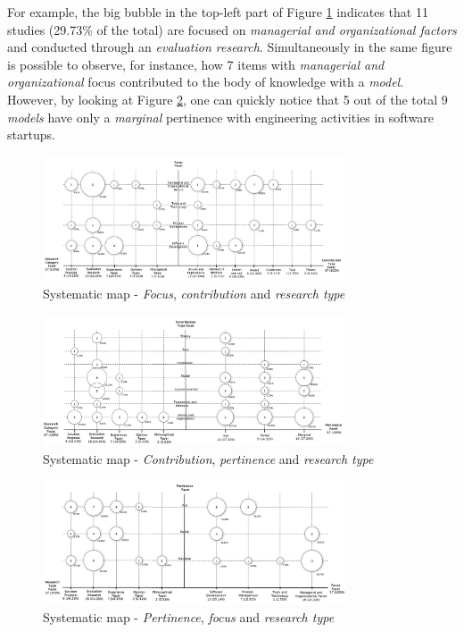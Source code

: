 \documentclass[final,5p,times,twocolumn]{elsarticle}
\begin{document}
For example, the big bubble in the top-left part of Figure \ref{fig:ms:fcr} indicates that 11 studies (29.73\% of the total) are focused on \textit{managerial and organizational factors} and conducted through an \textit{evaluation research}. Simultaneously in the same figure is possible to observe, for instance, how 7 items with \textit{managerial and organizational} focus contributed to the body of knowledge with a \textit{model}. However, by looking at Figure \ref{fig:ms:cpr}, one can quickly notice that 5 out of the total 9  \textit{models} have  only a \textit{marginal} pertinence with engineering activities in software startups.


\onecolumn
\begin{figure}[H]
\centering
\includegraphics[width=0.8\textwidth,keepaspectratio=true]{figures/FCR.png}
\caption{Systematic map - \textit{Focus}, \textit{contribution} and \textit{research type}}
\label{fig:ms:fcr}
\end{figure}


\begin{figure}[H]
\centering
\includegraphics[width=0.8\textwidth,keepaspectratio=true]{figures/CPR.png}
\caption{Systematic map - \textit{Contribution}, \textit{pertinence} and \textit{research type}}
\label{fig:ms:cpr}
\end{figure}


\begin{figure}[H]
\centering
\includegraphics[width=0.8\textwidth,keepaspectratio=true]{figures/PFR.png}
\caption{Systematic map - \textit{Pertinence}, \textit{focus} and \textit{research type}}\label{fig:ms:pfr}
\end{figure}
\end{document}
